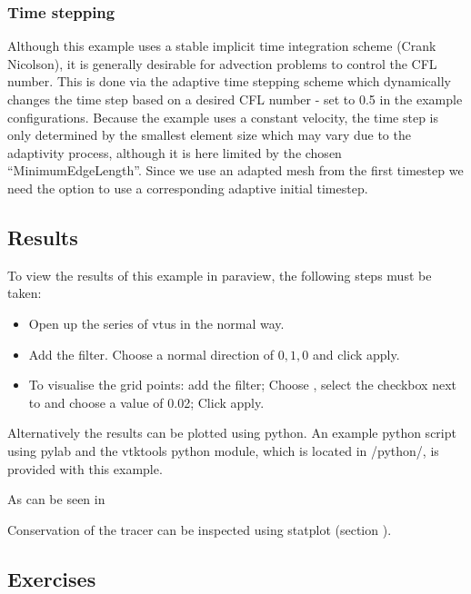 \subsubsection{Time stepping}
Although this example uses a stable implicit time integration scheme (Crank Nicolson),
it is generally desirable for advection problems to control the CFL number. This is done
via the adaptive time stepping scheme which dynamically changes the time 
step based on a desired CFL number - set to 0.5 in the example configurations. Because the 
example uses a constant velocity, the time step is only determined by the smallest 
element size which may vary due to the adaptivity process, although it is here
limited by the chosen ``MinimumEdgeLength''. Since we use an adapted mesh from the first 
timestep we need the option  to use a corresponding 
adaptive initial timestep.

\subsection{Results}
To view the results of this example in paraview, the following steps
must be taken:
\begin{itemize}
\item Open up the series of vtus in the normal way.
\item Add the  filter. Choose a normal direction of $0,1,0$ and click apply.
\item To visualise the grid points: add the  filter; Choose  ,
select the  checkbox next to  and choose a value of 0.02; Click apply.
\end{itemize}

Alternatively the results can be plotted using python. An example python script using pylab and the 
vtktools python module, which is located in \fluiditysourcepath/python/, is provided with this example.

As can be seen in 

Conservation of the tracer can be inspected using statplot (section ). 


\subsection{Exercises}



